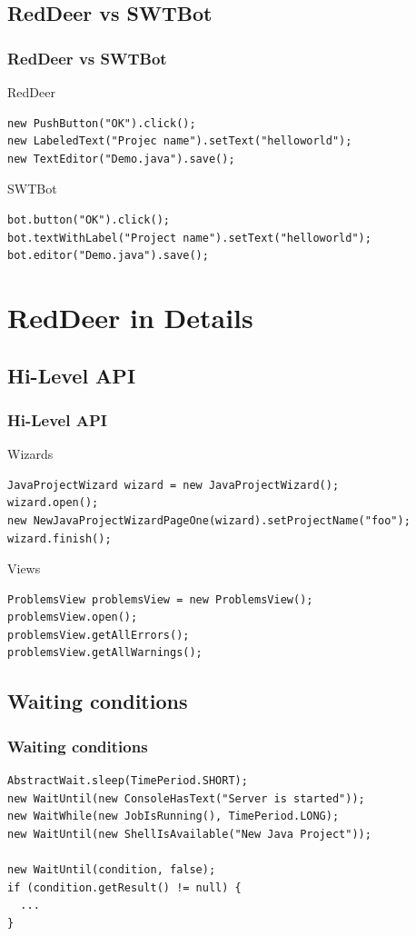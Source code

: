 \documentclass{beamer}
\begin{document}
\subsection{RedDeer vs SWTBot}
\begin{frame}[fragile]
\frametitle{RedDeer vs SWTBot}
RedDeer  
\begin{lstlisting}
new PushButton("OK").click();
new LabeledText("Projec name").setText("helloworld");
new TextEditor("Demo.java").save();
\end{lstlisting}
\vspace{0.5cm}
SWTBot
\begin{lstlisting}
bot.button("OK").click();
bot.textWithLabel("Project name").setText("helloworld");
bot.editor("Demo.java").save();
\end{lstlisting}
\end{frame}

\section{RedDeer in Details}

\subsection{Hi-Level API}
\begin{frame}[fragile]
\frametitle{Hi-Level API}
Wizards
\begin{lstlisting}
JavaProjectWizard wizard = new JavaProjectWizard();
wizard.open();
new NewJavaProjectWizardPageOne(wizard).setProjectName("foo");
wizard.finish();
\end{lstlisting}
\vspace{0.5cm}
Views
\begin{lstlisting}
ProblemsView problemsView = new ProblemsView();
problemsView.open();
problemsView.getAllErrors();
problemsView.getAllWarnings();
\end{lstlisting}
\end{frame}

\subsection{Waiting conditions}
\begin{frame}[fragile]
\frametitle{Waiting conditions}
\begin{lstlisting}
AbstractWait.sleep(TimePeriod.SHORT);
new WaitUntil(new ConsoleHasText("Server is started"));
new WaitWhile(new JobIsRunning(), TimePeriod.LONG);
new WaitUntil(new ShellIsAvailable("New Java Project"));

new WaitUntil(condition, false);
if (condition.getResult() != null) {
  ...
}
\end{lstlisting}
\end{frame}
\end{document}
